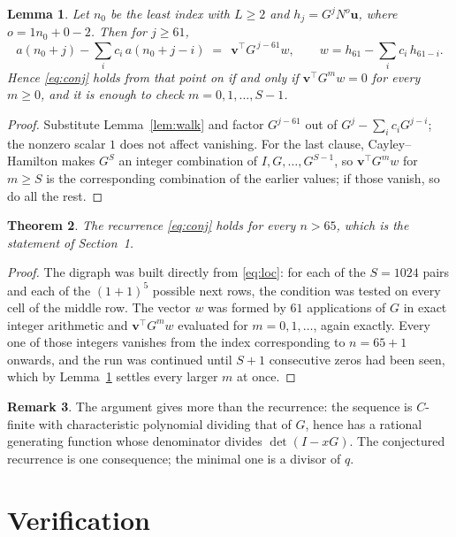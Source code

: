 \documentclass[11pt,a4paper]{article}
\theoremstyle{plain}
\newtheorem{theorem}{Theorem}
\newtheorem{lemma}[theorem]{Lemma}
\theoremstyle{definition}
\newtheorem{remark}[theorem]{Remark}
\begin{document}
\begin{lemma}\label{lem:crit}
Let $n_0$ be the least index with $L\ge2$ and $h_j=G^{j}N^{o}\mathbf{u}$, where
$o=1n_0+0-2$. Then for $j\ge61$,
\[
a(n_0+j)-\sum_i c_i\,a(n_0+j-i)\;=\;\,\mathbf{v}^{\!\top}G^{\,j-61}w,
\qquad w=h_{61}-\sum_i c_i\,h_{61-i} .
\]
Hence \eqref{eq:conj} holds from that point on if and only if
$\mathbf{v}^{\!\top}G^{m}w=0$ for every $m\ge0$, and it is enough to check
$m=0,1,\dots,S-1$.
\end{lemma}

\begin{proof}
Substitute Lemma~\ref{lem:walk} and factor $G^{j-61}$ out of
$G^{j}-\sum_ic_iG^{j-i}$; the nonzero scalar $1$ does not affect
vanishing. For the last clause, Cayley--Hamilton makes $G^{S}$ an integer combination of
$I,G,\dots,G^{S-1}$, so $\mathbf{v}^{\!\top}G^{m}w$ for $m\ge S$ is the corresponding
combination of the earlier values; if those vanish, so do all the rest.
\end{proof}

\begin{theorem}
The recurrence \eqref{eq:conj} holds for every $n>65$, which is the statement of
Section~1.
\end{theorem}

\begin{proof}
The digraph was built directly from \eqref{eq:loc}: for each of the $S=1024$ pairs and each
of the $(1+1)^{5}$ possible next rows, the condition was tested on every cell of
the middle row. The vector $w$ was formed by $61$ applications of $G$ in exact integer
arithmetic and $\mathbf{v}^{\!\top}G^{m}w$ evaluated for $m=0,1,\dots$, again exactly.
Every one of those integers vanishes from the index corresponding to $n=65+1$ onwards,
and the run was continued until $S+1$ consecutive zeros had been seen, which by
Lemma~\ref{lem:crit} settles every larger $m$ at once.
\end{proof}

\begin{remark}
The argument gives more than the recurrence: the sequence is $C$-finite with characteristic
polynomial dividing that of $G$, hence has a rational generating function whose denominator
divides $\det(I-xG)$. The conjectured recurrence is one consequence; the minimal one is a
divisor of $q$.
\end{remark}

\section{Verification}
\end{document}
